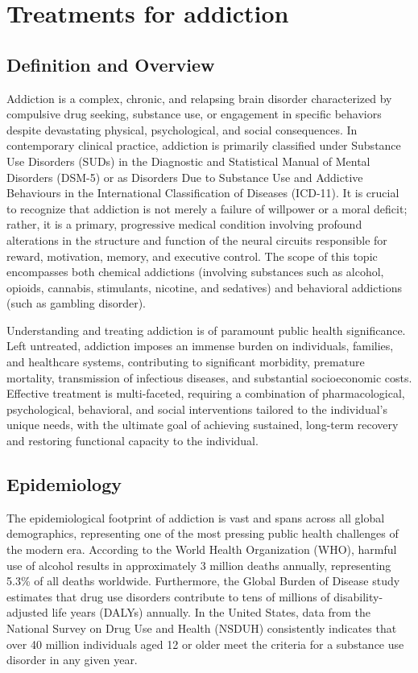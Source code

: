 \chapter{Treatments for addiction}

\section*{Definition and Overview}
Addiction is a complex, chronic, and relapsing brain disorder characterized by compulsive drug seeking, substance use, or engagement in specific behaviors despite devastating physical, psychological, and social consequences. In contemporary clinical practice, addiction is primarily classified under Substance Use Disorders (SUDs) in the Diagnostic and Statistical Manual of Mental Disorders (DSM-5) or as Disorders Due to Substance Use and Addictive Behaviours in the International Classification of Diseases (ICD-11). It is crucial to recognize that addiction is not merely a failure of willpower or a moral deficit; rather, it is a primary, progressive medical condition involving profound alterations in the structure and function of the neural circuits responsible for reward, motivation, memory, and executive control. The scope of this topic encompasses both chemical addictions (involving substances such as alcohol, opioids, cannabis, stimulants, nicotine, and sedatives) and behavioral addictions (such as gambling disorder).

Understanding and treating addiction is of paramount public health significance. Left untreated, addiction imposes an immense burden on individuals, families, and healthcare systems, contributing to significant morbidity, premature mortality, transmission of infectious diseases, and substantial socioeconomic costs. Effective treatment is multi-faceted, requiring a combination of pharmacological, psychological, behavioral, and social interventions tailored to the individual's unique needs, with the ultimate goal of achieving sustained, long-term recovery and restoring functional capacity to the individual.

\section*{Epidemiology}
The epidemiological footprint of addiction is vast and spans across all global demographics, representing one of the most pressing public health challenges of the modern era. According to the World Health Organization (WHO), harmful use of alcohol results in approximately 3 million deaths annually, representing 5.3\% of all deaths worldwide. Furthermore, the Global Burden of Disease study estimates that drug use disorders contribute to tens of millions of disability-adjusted life years (DALYs) annually. In the United States, data from the National Survey on Drug Use and Health (NSDUH) consistently indicates that over 40 million individuals aged 12 or older meet the criteria for a substance use disorder in any given year.

